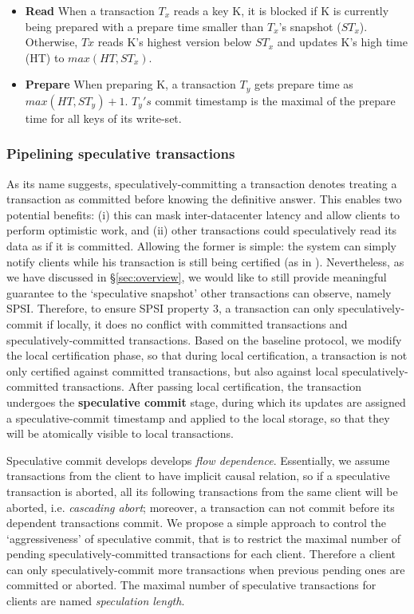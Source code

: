 \begin{itemize}
\item \textbf{Read} When a transaction $T_x$ reads a key K, it is blocked if K is currently being prepared with a prepare time smaller than $T_x$'s snapshot ($ST_x$). Otherwise, $Tx$ reads K's highest version below $ST_x$ and updates K's high time (HT) to $max(HT, ST_x)$.
\item \textbf{Prepare} When preparing K, a transaction $T_y$ gets prepare time as $max(HT, ST_y)+1$. $T_y's$ commit timestamp is the maximal of the prepare time for all keys of its write-set.
\end{itemize}

\subsubsection{Pipelining speculative transactions}
As its name suggests, speculatively-committing a transaction denotes treating a transaction as committed before knowing the definitive answer. This enables two potential benefits: (i) this can mask inter-datacenter latency and allow clients to perform optimistic work, and (ii) other transactions could speculatively read its data as if it is committed. Allowing the former is simple: the system can simply notify clients while his transaction is still being certified (as in \cite{pang2014planet}). Nevertheless, as we have discussed in \S \ref{sec:overview}, we would like to still provide meaningful guarantee to the `speculative snapshot' other transactions can observe, namely SPSI. Therefore, to ensure SPSI property 3, a transaction can only speculatively-commit if locally, it does no conflict with committed transactions and speculatively-committed transactions. Based on the baseline protocol, we modify the local certification phase, so that during local certification, a transaction is not only certified against committed transactions, but also against local speculatively-committed transactions. After passing local certification, the transaction undergoes the \textbf{speculative commit} stage, during which its updates are assigned a speculative-commit timestamp and applied to the local storage, so that they will be atomically visible to local transactions.

Speculative commit develops develops \textit{flow dependence}. Essentially, we assume transactions from the client to have implicit causal relation, so if a speculative transaction is aborted, all its following transactions from the same client will be aborted, i.e. \textit{cascading abort}; moreover, a transaction can not commit before its dependent transactions commit. We propose a simple approach to control the `aggressiveness' of speculative commit, that is to restrict the maximal number of pending speculatively-committed transactions for each client. Therefore a client can only speculatively-commit more transactions when previous pending ones are committed or aborted. The maximal number of speculative transactions for clients are named \textit{speculation length}.

